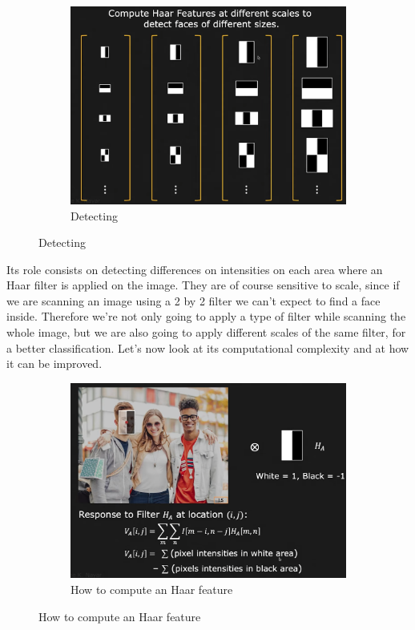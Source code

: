 \documentclass[12pt,a4paper]{article}
\begin{document}
\begin{large}
\begin{figure} [!hbp]
\begin{subfigure}[b]{0.4\textwidth}
    \end{subfigure}
    \hspace{0.1cm}
    \begin{subfigure}[b]{0.4\textwidth}
    \centering
    \captionsetup{justification=centering}
      \includegraphics[width=\textwidth]{images/haar3.png}
      \caption{Detecting }
      
    \end{subfigure}
  \end{figure}
Its role consists on detecting differences on intensities on each area where an Haar filter is applied on the image. They are of course sensitive to scale, since if we are scanning an image using a 2 by 2 filter we can't expect to find a face inside. Therefore we're not only going to apply a type of filter while scanning the whole image, but we are also going to apply different scales of the same filter, for a better classification. 
Let's now look at its computational complexity and at how it can be improved.
\begin{figure} [!hbp]
  \centering
    \begin{subfigure}[b]{0.3\textwidth}
    \centering
    \captionsetup{justification=centering}
      \includegraphics[width=\textwidth]{images/haar4.png}
      \caption{How to compute an Haar feature}
      

\end{subfigure}
\end{figure}
\end{large}
\end{document}
